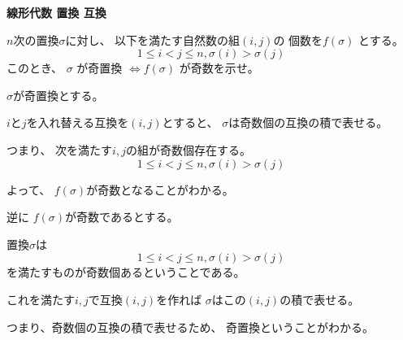 \documentclass[12pt,b5paper]{ltjsarticle}
\begin{document}
\hrulefill

\textbf{線形代数 置換 互換}

$n$次の置換$\sigma$に対し、
以下を満たす自然数の組$(i,j)$の
個数を$f(\sigma)$
とする。
\begin{equation}
 1\leq i < j \leq n, \sigma(i) >\sigma(j)
\end{equation}
このとき、
$\sigma$
が奇置換
$\Leftrightarrow f(\sigma)$
が奇数を示せ。

\dotfill

$\sigma$が奇置換とする。


$i$と$j$を入れ替える互換を$(i,j)$とすると、
$\sigma$は奇数個の互換の積で表せる。

%
%
%


つまり、
次を満たす$i,j$の組が奇数個存在する。
\begin{equation}
 1\leq i < j \leq n, \sigma(i) >\sigma(j)
\end{equation}

よって、
$f(\sigma)$が奇数となることがわかる。

\dotfill

逆に
$f(\sigma)$が奇数であるとする。

置換$\sigma$は
\begin{equation}
 1\leq i < j \leq n, \sigma(i) >\sigma(j)
\end{equation}
を満たすものが奇数個あるということである。

これを満たす$i,j$で互換$(i,j)$を作れば
$\sigma$はこの$(i,j)$の積で表せる。


つまり、奇数個の互換の積で表せるため、
奇置換ということがわかる。



\hrulefill
\end{document}
